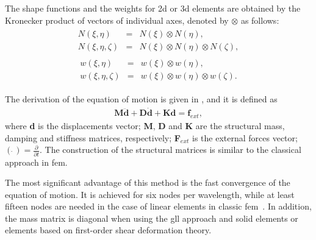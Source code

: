 \documentclass[a4paper,fleqn]{cas-dc}
\begin{document}
The shape functions and the weights for \ac{2d} or \ac{3d} elements are obtained by the Kronecker product of vectors of individual axes, denoted by \(\otimes\) as follows:
\begin{eqnarray}
	\begin{array}{rcl}
		N(\xi,\eta) & = & N(\xi)\otimes N(\eta),\\
		N(\xi,\eta,\zeta) & = & N(\xi)\otimes N(\eta)\otimes N(\zeta),
	\end{array}
	\label{eq:shape_functions}
\end{eqnarray}
\begin{eqnarray}
	\begin{array}{rcl}
		w(\xi,\eta) & = & w(\xi)\otimes w(\eta),\\
		w(\xi,\eta,\zeta) & = & w(\xi)\otimes w(\eta)\otimes w(\zeta).
	\end{array}
	\label{eq:weights}
\end{eqnarray}

The derivation of the equation of motion is given in \cite{ostachowicz2011guided}, and it is defined as
\begin{eqnarray}
	\label{eq:motion}
	\textbf{M} \ddot{\textbf{d}} + \textbf{D} \dot{\textbf{d}} + \textbf{K} \textbf{d} = \textbf{f}_{ext},
\end{eqnarray}
where \textbf{d} is the displacements vector; \textbf{M}, \textbf{D} and \textbf{K} are the structural mass, damping and stiffness matrices, respectively; \textbf{F}$_{ext}$ is the external forces vector; \((\dot{\ })=\frac{\partial}{\partial t}\).
The construction of the structural matrices is similar to the classical approach in \ac{fem}.

The most significant advantage of this method is the fast convergence of the equation of motion.
It is achieved for six nodes per wavelength, while at least fifteen nodes are needed in the case of linear elements in classic \ac{fem}~\cite{wee2017simulating}.
In addition, the mass matrix is diagonal when using the \ac{gll} approach and solid elements or elements based on first-order shear deformation theory.
\end{document}
